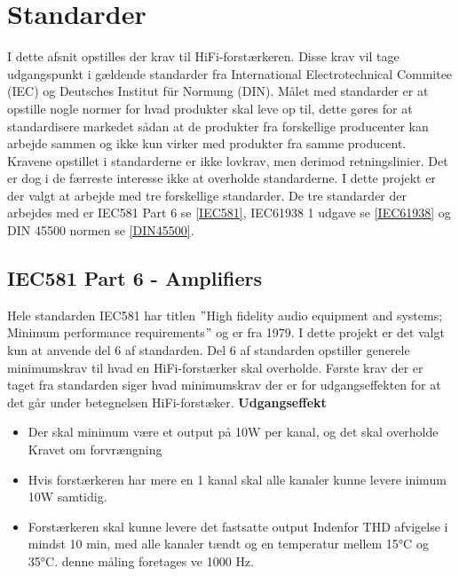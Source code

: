 \section{Standarder}
I dette afsnit opstilles der krav til HiFi-forstærkeren. Disse krav vil tage udgangspunkt i gældende standarder fra International Electrotechnical Commitee (IEC) og Deutsches Institut f\"{u}r Normung (DIN). Målet med standarder er at opstille nogle normer for hvad produkter skal leve op til, dette gøres for at standardisere markedet sådan at de produkter fra forskellige producenter kan arbejde sammen og ikke kun virker med produkter fra samme producent. Kravene opstillet i standarderne er ikke lovkrav, men derimod retningslinier. Det er dog i de færreste interesse ikke at overholde standarderne.
\newline
\newline
I dette projekt er der valgt at arbejde med tre forskellige standarder. De tre standarder der arbejdes med er IEC581 Part 6 se \ref{IEC581}, IEC61938 1 udgave se \ref{IEC61938} og DIN 45500 normen se \ref{DIN45500}.


\subsection*{IEC581 Part 6 - Amplifiers}
\label{IEC581}
Hele standarden IEC581 har titlen $"$High fidelity audio equipment and systems; Minimum performance requirements$"$ og er fra 1979. I dette projekt er det valgt kun at anvende del 6 af standarden. Del 6 af standarden opstiller generele minimumskrav til hvad en HiFi-forstærker skal overholde. \cite{IEC581-6}%
\newline
\newline
Første krav der er taget fra standarden siger hvad minimumskrav der er for udgangseffekten for at det går under betegnelsen HiFi-forstæker. 
\newline
\newline
\textbf{Udgangseffekt}
\begin{itemize}
\item Der skal minimum være et output på 10W per kanal, og det skal overholde Kravet om forvrængning
\item Hvis forstærkeren har mere en 1 kanal skal alle kanaler kunne levere inimum 10W samtidig.
\item Forstærkeren skal kunne levere det fastsatte output Indenfor THD afvigelse i mindst 10 min, med alle kanaler tændt og en temperatur mellem 15°C og 35°C. denne måling foretages ve 1000 Hz.
\end{itemize}

